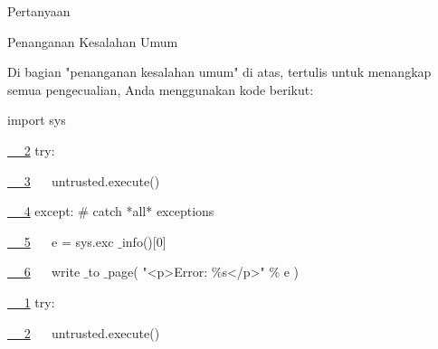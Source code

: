 \documentclass[a4paper,12pt]{report}
\begin{document}
\noindent 
\vspace{14pt}
\noindent 
{\fontsize{14pt}{14pt}\selectfont Pertanyaan \\} \par
\noindent 
\vspace{14pt}
\noindent 
{\fontsize{14pt}{14pt}\selectfont Penanganan Kesalahan Umum \\} \par
\noindent 
\vspace{14pt}
\noindent 
{\fontsize{14pt}{14pt}\selectfont Di bagian "penanganan kesalahan umum" di atas, tertulis untuk menangkap semua pengecualian, Anda menggunakan kode berikut: \\} \par
\vspace{16pt}
\noindent 
{\fontsize{10pt}{10pt}\selectfont import sys} \par
\noindent 
\href{https://wiki.python.org/moin/HandlingExceptions}{~~ 2}
{\fontsize{10pt}{10pt}\selectfont  try:} \par
\noindent 
\vspace{10pt}
\noindent 
\href{https://wiki.python.org/moin/HandlingExceptions}{~~ 3}
{\fontsize{10pt}{10pt}\selectfont ~~ untrusted.execute()} \par
\noindent 
\vspace{10pt}
\noindent 
\href{https://wiki.python.org/moin/HandlingExceptions}{~~ 4}
{\fontsize{10pt}{10pt}\selectfont  except:  $  \#  $ catch *all* exceptions} \par
\noindent 
\vspace{10pt}
\noindent 
\href{https://wiki.python.org/moin/HandlingExceptions}{~~ 5}
{\fontsize{10pt}{10pt}\selectfont ~~ e = sys.exc $  \_  $info()[0]} \par
\noindent 
\vspace{10pt}
\noindent 
\href{https://wiki.python.org/moin/HandlingExceptions}{~~ 6}
{\fontsize{10pt}{10pt}\selectfont ~~ write $  \_  $to $  \_  $page( "<p>Error:  $  \%  $s</p>"  $  \%  $ e )} \par
\vspace{16pt}
\noindent 
\href{https://wiki.python.org/moin/HandlingExceptions}{~~ 1}
{\fontsize{10pt}{10pt}\selectfont  try:} \par
\noindent 
\vspace{10pt}
\noindent 
\href{https://wiki.python.org/moin/HandlingExceptions}{~~ 2}
{\fontsize{10pt}{10pt}\selectfont ~~ untrusted.execute()} \par
\noindent 
\vspace{10pt}
\end{document}
